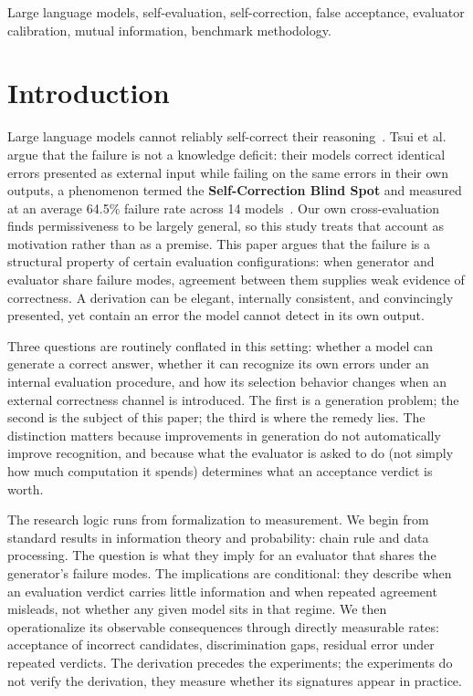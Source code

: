 \documentclass[a4paper,journal]{IAENGtran}
\begin{document}
\begin{IAENGkeywords}
Large language models, self-evaluation, self-correction, false acceptance, evaluator
calibration, mutual information, benchmark methodology.
\end{IAENGkeywords}

\IAENGpeerreviewmaketitle

\section{Introduction}

Large language models cannot reliably self-correct their reasoning~\cite{huang2024selfcorrect}.
Tsui et al. argue that the failure is not a knowledge deficit: their models correct
identical errors presented as external input while failing on the same errors in their
own outputs, a phenomenon termed the \textbf{Self-Correction Blind Spot} and measured
at an average 64.5\% failure rate across 14 models~\cite{tsui2025selfcorrection}.
Our own cross-evaluation finds permissiveness to be largely general, so this study
treats that account as motivation rather than as a premise. This paper argues that the failure is a
structural property of certain evaluation configurations: when generator and evaluator
share failure modes, agreement between them supplies weak evidence of correctness. A
derivation can be elegant, internally consistent, and convincingly presented, yet contain
an error the model cannot detect in its own output.

Three questions are routinely conflated in this setting: whether a model can generate a
correct answer, whether it can recognize its own errors under an internal evaluation
procedure, and how its selection behavior changes when an external correctness channel is
introduced. The first is a generation problem; the second is the subject of this paper;
the third is where the remedy lies. The distinction matters because improvements in
generation do not automatically improve recognition, and because what the evaluator is
asked to do (not simply how much computation it spends) determines what an acceptance
verdict is worth.

The research logic runs from formalization to measurement. We begin from standard
results in information theory and probability: chain rule and data processing. The question is what they imply for an evaluator that shares the
generator's failure modes. The implications are conditional: they describe when an
evaluation verdict carries little information and when repeated agreement misleads,
not whether any given model sits in that regime. We then operationalize its observable consequences
through directly measurable rates: acceptance of incorrect candidates,
discrimination gaps, residual error under repeated verdicts. The derivation precedes
the experiments; the experiments do not verify the derivation, they measure whether
its signatures appear in practice.
\end{document}
